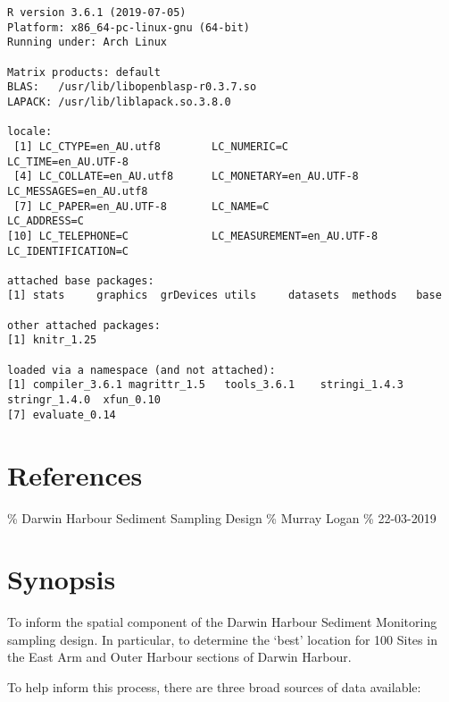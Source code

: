 \documentclass[a4paper]{article}
\begin{document}
\begin{verbatim}
R version 3.6.1 (2019-07-05)
Platform: x86_64-pc-linux-gnu (64-bit)
Running under: Arch Linux

Matrix products: default
BLAS:   /usr/lib/libopenblasp-r0.3.7.so
LAPACK: /usr/lib/liblapack.so.3.8.0

locale:
 [1] LC_CTYPE=en_AU.utf8        LC_NUMERIC=C               LC_TIME=en_AU.UTF-8       
 [4] LC_COLLATE=en_AU.utf8      LC_MONETARY=en_AU.UTF-8    LC_MESSAGES=en_AU.utf8    
 [7] LC_PAPER=en_AU.UTF-8       LC_NAME=C                  LC_ADDRESS=C              
[10] LC_TELEPHONE=C             LC_MEASUREMENT=en_AU.UTF-8 LC_IDENTIFICATION=C       

attached base packages:
[1] stats     graphics  grDevices utils     datasets  methods   base     

other attached packages:
[1] knitr_1.25

loaded via a namespace (and not attached):
[1] compiler_3.6.1 magrittr_1.5   tools_3.6.1    stringi_1.4.3  stringr_1.4.0  xfun_0.10     
[7] evaluate_0.14 
\end{verbatim}

\hypertarget{references}{%
\section{References}\label{references}}

\% Darwin Harbour Sediment Sampling Design \% Murray Logan \% 22-03-2019

\hypertarget{synopsis-1}{%
\section{Synopsis}\label{synopsis-1}}

To inform the spatial component of the Darwin Harbour Sediment
Monitoring sampling design. In particular, to determine the `best'
location for 100 Sites in the East Arm and Outer Harbour sections of
Darwin Harbour.

To help inform this process, there are three broad sources of data
available:
\end{document}
